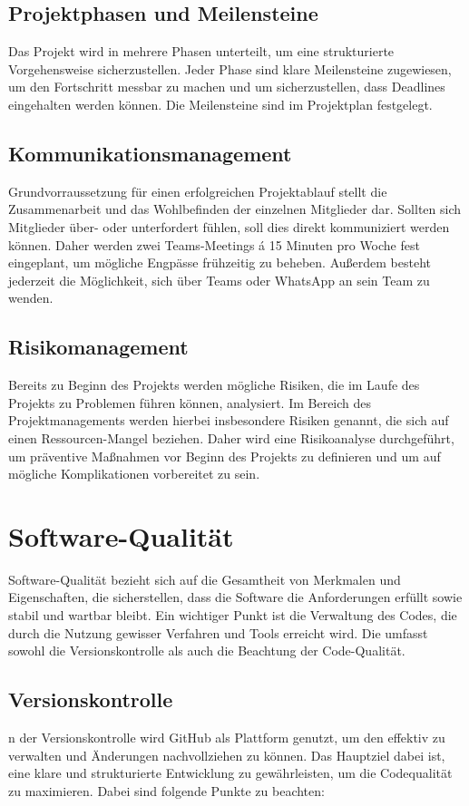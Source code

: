 \documentclass[a4paper,12pt]{article}
\begin{document}
\subsection{Projektphasen und Meilensteine} Das Projekt wird in mehrere Phasen unterteilt, um eine strukturierte Vorgehensweise sicherzustellen. Jeder Phase sind klare Meilensteine zugewiesen, um den Fortschritt messbar zu machen und um sicherzustellen, dass Deadlines eingehalten werden können. Die Meilensteine sind im Projektplan festgelegt.

\subsection{Kommunikationsmanagement} Grundvorraussetzung für einen erfolgreichen Projektablauf stellt die Zusammenarbeit und das Wohlbefinden der einzelnen Mitglieder dar. Sollten sich Mitglieder über- oder unterfordert fühlen, soll dies direkt kommuniziert werden können. Daher werden zwei Teams-Meetings á 15 Minuten pro Woche fest eingeplant, um mögliche Engpässe frühzeitig zu beheben. Außerdem besteht jederzeit die Möglichkeit, sich über Teams oder WhatsApp an sein Team zu wenden.

\subsection{Risikomanagement} Bereits zu Beginn des Projekts werden mögliche Risiken, die im Laufe des Projekts zu Problemen führen können, analysiert. Im Bereich des Projektmanagements werden hierbei insbesondere Risiken genannt, die sich auf einen Ressourcen-Mangel beziehen. Daher wird eine Risikoanalyse durchgeführt, um präventive Maßnahmen vor Beginn des Projekts zu definieren und um auf mögliche Komplikationen vorbereitet zu sein.

\newpage
\section{Software-Qualität}
Software-Qualität bezieht sich auf die Gesamtheit von Merkmalen und Eigenschaften, die sicherstellen, dass die Software die Anforderungen erfüllt sowie stabil und wartbar bleibt. Ein wichtiger Punkt ist die Verwaltung des Codes, die durch die Nutzung gewisser Verfahren und Tools erreicht wird. Die umfasst sowohl die Versionskontrolle als auch die Beachtung der Code-Qualität.

\subsection{Versionskontrolle}
n der Versionskontrolle wird GitHub als Plattform genutzt, um den effektiv zu verwalten und Änderungen nachvollziehen zu können. Das Hauptziel dabei ist, eine klare und strukturierte Entwicklung zu gewährleisten, um die Codequalität zu maximieren. Dabei sind folgende Punkte zu beachten:
\end{document}
